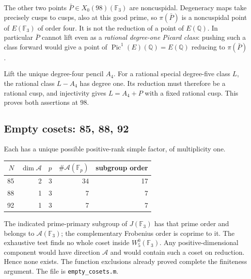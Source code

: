 \documentclass[11pt,a4paper]{article}
\newcommand{\Q}{\mathbb Q}
\newcommand{\F}{\mathbb F}
\newcommand{\Pic}{\operatorname{Pic}}
\newcommand{\A}{\mathcal A}
\newcommand{\W}{W^0_5}
\begin{document}
The other two points $\bar P\in X_0(98)(\F_3)$ are noncuspidal.
Degeneracy maps take precisely cusps to cusps, also at this good prime,
so $\pi(\bar P)$ is a noncuspidal point of $E(\F_3)$ of order four.
It is not the reduction of a point of $E(\Q)$.
In particular $\bar P$ cannot lift even as a \emph{rational degree-one
Picard class}: pushing such a class forward would give a point of
$\Pic^1(E)(\Q)=E(\Q)$ reducing to $\pi(\bar P)$.

Lift the unique degree-four pencil $A_4$. For a rational special
degree-five class $L$, the rational class $L-A_4$ has degree one.
Its reduction must therefore be a rational cusp, and injectivity gives
$L=A_4+P$ with a fixed rational cusp. This proves both assertions at $98$.

\subsection{Empty cosets: 85, 88, 92}
Each has a unique possible positive-rank simple factor, of multiplicity one.
\begin{center}
\begin{tabular}{@{}rrrrr@{}}
\toprule $N$&$\dim\A$&$p$&$\#\A(\F_p)$&subgroup order\\
\midrule
85&2&3&34&17\\
88&1&3&7&7\\
92&1&3&7&7\\
\bottomrule
\end{tabular}
\end{center}
The indicated prime-primary subgroup of $J(\F_3)$ has that prime order
and belongs to $\A(\F_3)$; the complementary Frobenius order is coprime
to it. The exhaustive test finds no whole coset inside $\W(\F_3)$.
Any positive-dimensional component would have direction $\A$ and
would contain such a coset on reduction. Hence none exists.
The function exclusions already proved complete the finiteness argument.
The file is \texttt{empty\_cosets.m}.
\end{document}
